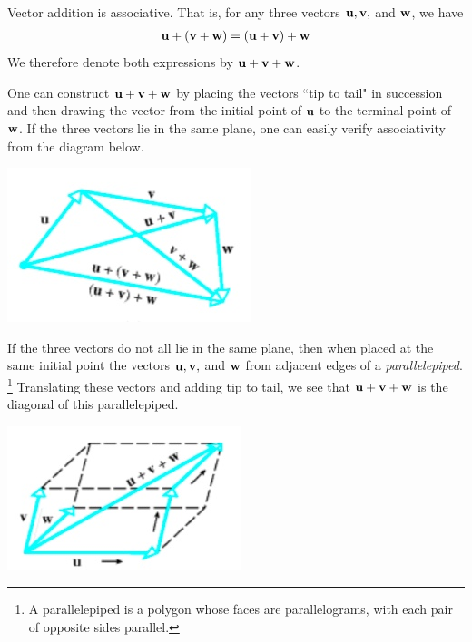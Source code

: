 \documentclass[12pt,letterpaper,reqno]{article}
\numberwithin{equation}{section}
\begin{document}
\begin{prop}
	Vector addition is associative. That is, for any three vectors ${\bf u}, {\bf v},$ and ${\bf w}$, we have
	\begin{align*}
		{\bf u}+({\bf v}+{\bf w})=({\bf u}+{\bf v})+{\bf w}
	\end{align*}
We therefore denote both expressions by ${\bf u}+{\bf v}+{\bf w}$. 
\end{prop}

\begin{pf}
One can construct ${\bf u}+{\bf v}+{\bf w}$ by placing the vectors ``tip to tail" in succession and then drawing the vector from the initial point of ${\bf u}$ to the terminal point of ${\bf w}$. If the three vectors lie in the same plane, one can easily verify associativity from the diagram below.
\end{pf}

\begin{center}
	\includegraphics[scale=0.5]{figures_mvc/associativity_of_vector_addition}
\end{center}

If the three vectors do not all lie in the same plane, then when placed at the same initial point the vectors ${\bf u}, {\bf v},$ and ${\bf w}$ from adjacent edges of a \emph{parallelepiped}. \footnote{A parallelepiped is a polygon whose faces are parallelograms, with each pair of opposite sides parallel.} Translating these vectors and adding tip to tail, we see that ${\bf u}+{\bf v}+{\bf w}$ is the diagonal of this parallelepiped.

\begin{center}
	\includegraphics[scale=0.5]{figures_mvc/volume_of_parallelepiped_vectors}
\end{center}
\end{document}
